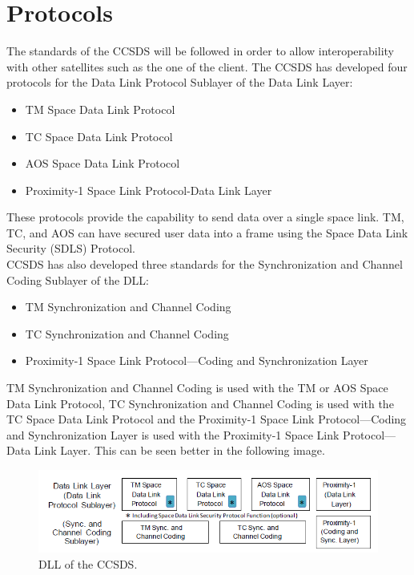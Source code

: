 \documentclass[12pt,a4paper]{report}
\begin{document}
\section{Protocols}
The standards of the CCSDS will be followed in order to allow interoperability with other satellites such as the one of the client. The CCSDS has developed four protocols for the Data Link Protocol Sublayer of the Data Link Layer\cite{Secretariat2014}:
\begin{itemize}
\item TM Space Data Link Protocol
\item TC Space Data Link Protocol
\item AOS Space Data Link Protocol
\item Proximity-1 Space Link Protocol-Data Link Layer
\end{itemize}
These protocols provide the capability to send data over a single space link. TM, TC, and AOS can have secured user data into a frame using the Space Data Link Security (SDLS) Protocol.\\
 CCSDS has also developed three standards for the Synchronization and Channel Coding Sublayer of the DLL:
 \begin{itemize}
 \item TM Synchronization and Channel Coding
 \item TC Synchronization and Channel Coding
 \item Proximity-1 Space Link Protocol—Coding and Synchronization Layer
 \end{itemize}
TM Synchronization and Channel Coding is used with the TM or AOS Space Data Link
Protocol, TC Synchronization and Channel Coding is used with the TC Space Data Link Protocol and the Proximity-1 Space Link Protocol—Coding and Synchronization Layer is
used with the Proximity-1 Space Link Protocol—Data Link Layer. This can be seen better in the following image.\\
\begin{figure}[H]
\begin{center}
\includegraphics[scale=0.9]{DLLCCSDS.PNG}   
\caption{DLL of the CCSDS.}
\end{center}
\end{figure}
\end{document}
